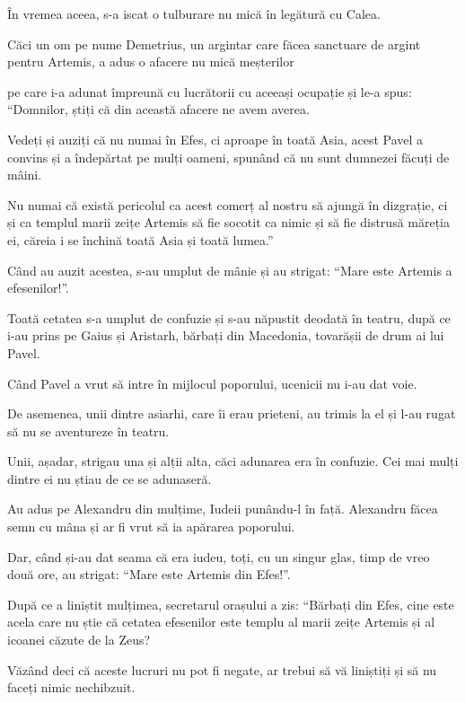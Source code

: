 {În vremea aceea, s-a iscat o tulburare nu mică în legătură cu Calea.

Căci un om pe nume Demetrius, un argintar care făcea sanctuare de argint pentru Artemis, a adus o afacere nu mică meșterilor

pe care i-a adunat împreună cu lucrătorii cu aceeași ocupație și le-a spus: “Domnilor, știți că din această afacere ne avem averea.

Vedeți și auziți că nu numai în Efes, ci aproape în toată Asia, acest Pavel a convins și a îndepărtat pe mulți oameni, spunând că nu sunt dumnezei făcuți de mâini.

Nu numai că există pericolul ca acest comerț al nostru să ajungă în dizgrație, ci și ca templul marii zeițe Artemis să fie socotit ca nimic și să fie distrusă măreția ei, căreia i se închină toată Asia și toată lumea.”


\par }{\PP {}Când au auzit acestea, s-au umplut de mânie și au strigat: “Mare este Artemis a efesenilor!”.

Toată cetatea s-a umplut de confuzie și s-au năpustit deodată în teatru, după ce i-au prins pe Gaius și Aristarh, bărbați din Macedonia, tovarășii de drum ai lui Pavel.

Când Pavel a vrut să intre în mijlocul poporului, ucenicii nu i-au dat voie.

De asemenea, unii dintre asiarhi, care îi erau prieteni, au trimis la el și l-au rugat să nu se aventureze în teatru.

Unii, așadar, strigau una și alții alta, căci adunarea era în confuzie. Cei mai mulți dintre ei nu știau de ce se adunaseră.

Au adus pe Alexandru din mulțime, Iudeii punându-l în față. Alexandru făcea semn cu mâna și ar fi vrut să ia apărarea poporului.

Dar, când și-au dat seama că era iudeu, toți, cu un singur glas, timp de vreo două ore, au strigat: “Mare este Artemis din Efes!”.


\par }{\PP {}După ce a liniștit mulțimea, secretarul orașului a zis: “Bărbați din Efes, cine este acela care nu știe că cetatea efesenilor este templu al marii zeițe Artemis și al icoanei căzute de la Zeus?

Văzând deci că aceste lucruri nu pot fi negate, ar trebui să vă liniștiți și să nu faceți nimic nechibzuit.

}
